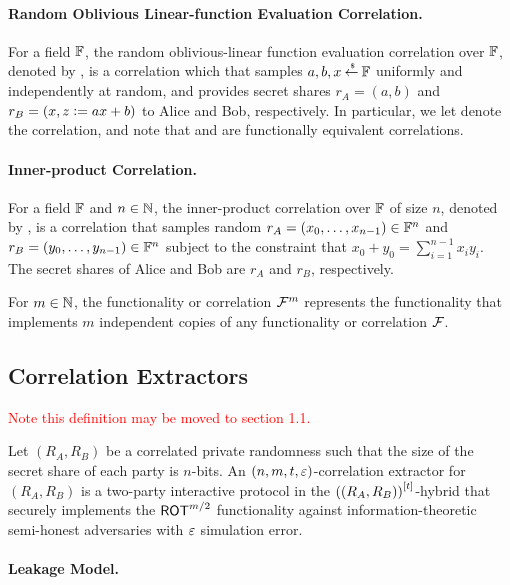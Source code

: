 \paragraph{Random Oblivious Linear-function Evaluation Correlation.}
For a field ${\mathbb F}$, the random oblivious-linear function evaluation correlation over ${\mathbb F}$, denoted by \ROLE[\bbF], is a correlation which that samples $a,b,x \mathbin{\stackrel{\mbox{\,\tiny \$}}{\gets}} {\mathbb F}$ uniformly and independently at random, and provides secret shares $r_A = (a,b)$ and $r_B = (x, z {\;\vcentcolon=\;} ax+b)$ to Alice and Bob, respectively.
In particular, we let \ROLE denote the \ROLE[\GF{2}] correlation, and note that \ROT and \ROLE are functionally equivalent correlations.

\paragraph{Inner-product Correlation.}
For a field ${\mathbb F}$ and $n \in {\mathbb N}$, the inner-product correlation over ${\mathbb F}$ of size $n$, denoted by \IP[\bbF^n], is a correlation that samples random $r_A = (x_0,\dotsc, x_{n-1}) \in {\mathbb F}^n$ and $r_B = (y_0,\dotsc, y_{n-1}) \in {\mathbb F}^n$ subject to the constraint that $x_0 + y_0 = \sum_{i=1}^{n-1} x_iy_i$.
The secret shares of Alice and Bob are $r_A$ and $r_B$, respectively.

For $m \in {\mathbb N}$, the functionality or correlation ${\mathcal F}^m$ represents the functionality that implements $m$ independent copies of any functionality or correlation ${\mathcal F}$.

\subsection{Correlation Extractors}\label{sec:prelim-corr-ext}

\textcolor{red}{Note this definition may be moved to section 1.1.}
\begin{definition}
	Let $(R_A, R_B)$ be a correlated private randomness such that the size of the secret share of each party is $n$-bits.
	An $(n,m,t,\varepsilon)$-correlation extractor for $(R_A, R_B)$ is a two-party interactive protocol in the $\left({(R_A,R_B)}\right)^{[t]}$-hybrid that securely implements the $\ROT[m/2]$ functionality against information-theoretic semi-honest adversaries with $\varepsilon$ simulation error.
\end{definition}

\paragraph{Leakage Model.}

